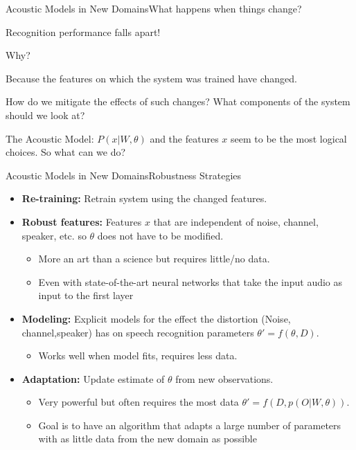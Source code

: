 \begin{frame}{Acoustic Models in New Domains}{What happens when things change?}

Recognition performance falls apart!

Why? \pause

Because the features on which the system was trained have changed. \pause

How do we mitigate the effects of such changes? What components of the system should we look at? \pause

The Acoustic Model: {\color{red} $P(x|W,\theta)$} and the features $x$ seem to be the most logical choices. So what can we do? 

\end{frame}

\begin{frame}{Acoustic Models in New Domains}{Robustness Strategies}


\pause

\begin{itemize}
\item {\bf Re-training:} Retrain system using the changed features. \pause
\item  {\bf Robust features:} Features $x$ that are independent of noise,
channel, speaker, etc. so $\theta$ does not have to be modified. \pause
  \begin{itemize}
     \item More an art than a science but requires little/no data. \pause
     \item Even with state-of-the-art neural networks that take the input audio as input to the first layer
  \end{itemize}
\item {\bf Modeling:} Explicit models for the effect the distortion (Noise, channel,speaker) has on speech recognition parameters $\theta' = f(\theta,D)$. \pause
  \begin{itemize}
  \item Works well when model fits, requires less data. \pause
  \end{itemize}
\item  {\bf Adaptation:} Update estimate of $\theta$ from new observations.  \pause
  \begin{itemize}
  \item Very powerful but often requires the most data $\theta' = f(D, p(O|W,\theta))$.
  \item Goal is to have an algorithm that adapts a large number of parameters with as little data from the new domain as possible
  \end{itemize}
  \end{itemize}

\end{frame}

